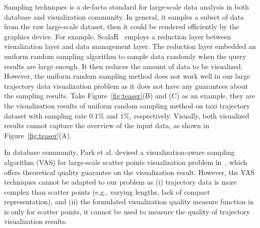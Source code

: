 Sampling techniques is a de-facto standard for large-scale data analysis in both database and visualization community.
In general, it samples a subset of data from the raw large-scale dataset, then it could be rendered efficiently by the graphics device.
For example, ScalaR~\cite{battle2013dynamic} employs a reduction layer between visualization layer and data management layer.
The reduction layer embedded an uniform random sampling algorithm to sample data randomly when the query results are large enough.
It then reduces the amount of data to be visualized.
However, the uniform random sampling method does not work well in our large trajectory data visualization problem as it does not have any guarantees about the sampling results.
Take Figure~\ref{fig:teaser}(B) and (C) as an example,
they are the visualization results of uniform random sampling method on \pt{} taxi trajectory dataset with sampling rate $0.1\%$ and $1\%$, respectively.
Visually, both visualized results cannot capture the overview of the input data, as shown in Figure~\ref{fig:teaser}(A).

In database community,  Park et al. devised a visualization-aware sampling algorithm (VAS) for large-scale scatter points visualization problem in~\cite{park2016visualization},
which offers theoretical quality guarantee on the visualization result.
However, the VAS techniques cannot be adapted to our problem as  (i) trajectory data is  more complex than scatter points (e.g., varying lengths, lack of compact representation),
and  (ii) the formulated visualization quality measure function in~\cite{park2016visualization} is only for scatter points, it cannot be used to measure the quality of trajectory visualization results.

